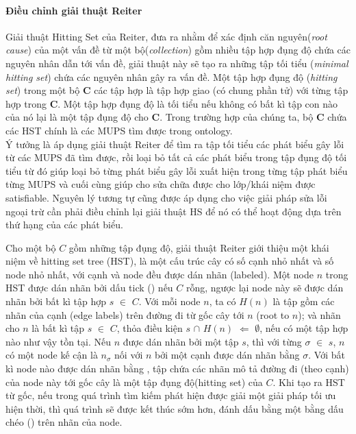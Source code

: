 	\paragraph{Điều chỉnh giải thuật Reiter} Giải thuật Hitting Set của Reiter\cite{hst}, đưa ra nhằm để xác định căn nguyên(\textit{root cause}) của một vấn đề từ một bộ(\textit{collection}) gồm nhiều tập hợp đụng độ chứa các nguyên nhân dẫn tới vấn đề, giải thuật này sẽ tạo ra những tập tối tiểu (\textit{minimal hitting set}) chứa các nguyên nhân gây ra vấn đề. Một tập hợp đụng độ (\textit{hitting set}) trong một bộ \textbf{C} các tập hợp là tập hợp giao (có chung phần tử) với từng tập hợp trong \textbf{C}. Một tập hợp đụng độ là tối tiểu nếu không có bất kì tập con nào của nó lại là một tập đụng độ cho \textbf{C}. Trong trường hợp của chúng ta, bộ \textbf{C} chứa các HST chính là các MUPS tìm được trong ontology.  \\\hspace*{.05\textwidth} Ý tưởng là áp dụng giải thuật Reiter để tìm ra tập tối tiểu các phát biểu gây lỗi từ các MUPS đã tìm được, rồi loại bỏ tất cả các phát biểu trong tập đụng độ tối tiểu từ đó giúp loại bỏ từng phát biểu gây lỗi xuất hiện trong từng tập phát biểu từng MUPS và cuối cùng giúp cho sửa chữa được cho lớp/khái niệm được satisfiable. Nguyên lý tương tự cũng được áp dụng cho việc giải pháp sửa lỗi ngoại trừ cần phải điều chỉnh lại giải thuật HS để nó có thể hoạt động dựa trên thứ hạng của các phát biểu.
	
	\hspace*{.05\textwidth} Cho một bộ $C$ gồm những tập đụng độ, giải thuật Reiter giới thiệu một khái niệm về hitting set tree (HST), là một cấu trúc cây có số cạnh nhỏ nhất và số node nhỏ nhất, với cạnh và node đều được dán nhãn (labeled). Một node $n$ trong HST được dán nhãn bởi dấu tick (\cmark) nếu $C$ rỗng, ngược lại node này sẽ được dán nhãn bởi bất kì tập hợp $s$ $\in$ $C$. Với mỗi node $n$, ta có $H(n)$ là tập gồm các nhãn của cạnh (edge labels) trên đường đi từ gốc cây tới $n$ (root to $n$); và nhãn cho $n$ là bất kì tập $s$ $\in$ $C$, thỏa điều kiện $s$ $\cap$ $H(n)$ $\Leftarrow$ $\emptyset$, nếu có một tập hợp nào như vậy tồn tại. Nếu $n$ được dán nhãn bởi một tập $s$, thì với từng $\sigma$ $\in$ $s$, $n$ có một node kế cận là $n_{\sigma}$ nối với $n$ bởi một cạnh được dán nhãn bằng $\sigma$. Với bất kì node nào được dán nhãn bằng \cmark , tập chứa các nhãn mô tả đường đi (theo cạnh) của node này tới gốc cây là một tập đụng độ(hitting set) của $C$. Khi tạo ra HST từ gốc, nếu trong quá trình tìm kiếm phát hiện được giải một giải pháp tối ưu hiện thời, thì quá trình sẽ được kết thúc sớm hơn, đánh dấu bằng một bằng dấu chéo (\xmark) trên nhãn của node.
	
